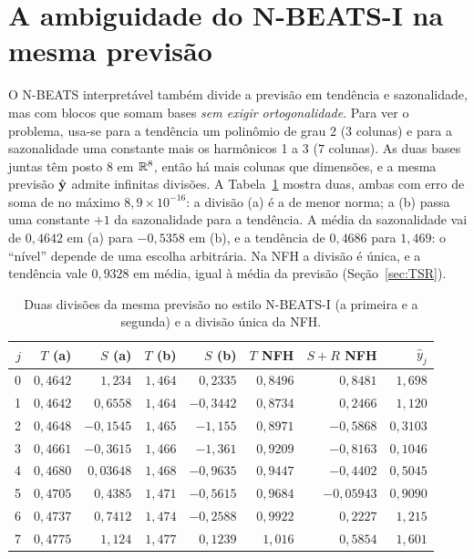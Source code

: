 \documentclass[11pt,a4paper]{article}
\begin{document}
\section{A ambiguidade do N-BEATS-I na mesma previsão}\label{sec:nbeats}

O N-BEATS interpretável também divide a previsão em tendência e sazonalidade, mas com blocos que somam bases \emph{sem exigir ortogonalidade}. Para ver o problema, usa-se para a tendência um polinômio de grau 2 ($3$ colunas) e para a sazonalidade uma constante mais os harmônicos 1 a 3 ($7$ colunas). As duas bases juntas têm posto $8$ em $\mathbb{R}^{8}$, então há mais colunas que dimensões, e a mesma previsão $\hat{\mathbf{y}}$ admite infinitas divisões. A Tabela~\ref{tab:nb} mostra duas, ambas com erro de soma de no máximo $8,9\times 10^{-16}$: a divisão (a) é a de menor norma; a (b) passa uma constante $+1$ da sazonalidade para a tendência. A média da sazonalidade vai de $0,4642$ em (a) para $-0,5358$ em (b), e a tendência de $0,4686$ para $1,469$: o ``nível'' depende de uma escolha arbitrária. Na NFH a divisão é única, e a tendência vale $0,9328$ em média, igual à média da previsão (Seção~\ref{sec:TSR}).

\begin{table}[H]
\centering
\caption{Duas divisões da mesma previsão no estilo N-BEATS-I (a primeira e a segunda) e a divisão única da NFH.}\label{tab:nb}
\footnotesize
\begin{tabular}{rrrrrrrr}
\toprule
$j$ & $T$ (a) & $S$ (a) & $T$ (b) & $S$ (b) & $T$ NFH & $S+R$ NFH & $\hat y_j$ \\
\midrule
0 & $0,4642$ & $1,234$ & $1,464$ & $0,2335$ & $0,8496$ & $0,8481$ & $1,698$ \\
1 & $0,4642$ & $0,6558$ & $1,464$ & $-0,3442$ & $0,8734$ & $0,2466$ & $1,120$ \\
2 & $0,4648$ & $-0,1545$ & $1,465$ & $-1,155$ & $0,8971$ & $-0,5868$ & $0,3103$ \\
3 & $0,4661$ & $-0,3615$ & $1,466$ & $-1,361$ & $0,9209$ & $-0,8163$ & $0,1046$ \\
4 & $0,4680$ & $0,03648$ & $1,468$ & $-0,9635$ & $0,9447$ & $-0,4402$ & $0,5045$ \\
5 & $0,4705$ & $0,4385$ & $1,471$ & $-0,5615$ & $0,9684$ & $-0,05943$ & $0,9090$ \\
6 & $0,4737$ & $0,7412$ & $1,474$ & $-0,2588$ & $0,9922$ & $0,2227$ & $1,215$ \\
7 & $0,4775$ & $1,124$ & $1,477$ & $0,1239$ & $1,016$ & $0,5854$ & $1,601$ \\
\bottomrule
\end{tabular}
\par\vspace{2pt}{\footnotesize Fonte: elaborado pelo autor.}
\end{table}
\end{document}
